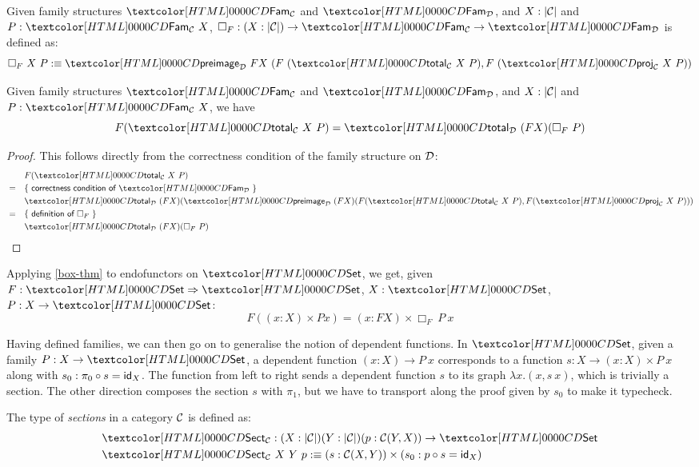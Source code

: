 \begin{definition}
  Given family structures $\Fam_{\Cc}$ and $\Fam_{\Dd}$, and
  $X : | \mathcal{C} |$ and $P : \Fam_{\Cc}\ X$,
  $\Box_F : (X : | \Cc |) \to \Fam_{\Cc} \to \Fam_{\Dd}$ is defined
  as:
  $$
  \Box_F\ X\ P \ddefeq \preimage_{\Dd}\ FX\ (F\ (\total_{\Cc}\ X\ P) ,
  F\ (\proj_{\Cc}\ X\ P))
  $$
\end{definition}

\begin{proposition}
  \label{box-thm}
  Given family structures $\Fam_{\Cc}$ and $\Fam_{\Dd}$, and
  $X : | \mathcal{C} |$ and $P : \Fam_{\Cc}\ X$, we have
  $$
  F (\total_{\Cc}\ X\ P) = \total_{\Dd}\ (F X) (\Box_F\ P)
  $$
\end{proposition}

\begin{proof}
  This follows directly from the correctness condition of the family
  structure on $\mathcal{D}$:
  \begin{align*}
    &&&F (\total_{\Cc}\ X\ P) \\
    &=& &\reasontext{correctness condition of $\Fam_{\Dd}$} \\
    &&&\total_{\Dd}\ (F X) (\preimage_{\Dd}\ (F X) (F (\total_{\Cc}\ X\ P), F (\proj_{\Cc}\ X\ P))) \\
    &=& &\reasontext{definition of $\Box_F$} \\
    &&&\total_{\Dd}\ (F X) (\Box_F\ P)
  \end{align*}
\end{proof}

\begin{corollary}
  Applying \cref{box-thm} to endofunctors on $\Set$, we get, given
  $F : \Func{\Set}{\Set}$, $X : \Set$, $P : X \to \Set$:
  $$
  F ((x : X) \times P x) = (x : FX) \times \Box_F\ P\ x
  $$
\end{corollary}

Having defined families, we can then go on to generalise the notion of
dependent functions. In $\Set$, given a family $P : X \to \Set$, a
dependent function $(x : X) \to P\ x$ corresponds to a function
$s : X \to (x : X) \times P\ x$ along with
$s_0 : \pi_0 \circ s = \id_X$. The function from left to right sends a
dependent function $s$ to its graph $\lambda x . (x , s\ x)$, which is
trivially a section. The other direction composes the section $s$ with
$\pi_1$, but we have to transport along the proof given by $s_0$ to
make it typecheck.

\begin{definition}
  The type of \emph{sections} in a category $\mathcal{C}$ is defined as:
  \begin{align*}
    &\Sect_{\Cc} : (X : | \Cc |) (Y : | \Cc |) (p : \Cc(Y,X)) \to \Set \\
    &\Sect_{\Cc}\ X\ Y\ p \ddefeq (s : \Cc(X,Y)) \times (s_0 : p \circ s = \id_X)
  \end{align*}
\end{definition}

